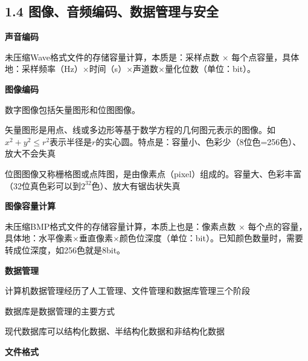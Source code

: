 \setcounter{section}{1}
\setcounter{subsection}{2}
\subsection{1.4 图像、音频编码、数据管理与安全}



\begin{compactenum}[1.]
\item \textbf{声音编码}

未压缩Wave格式文件的存储容量计算，本质是：采样点数 $\times$
每个点容量，具体地：采样频率（Hz）$\times$时间（s）$\times$声道数$\times$量化位数（单位：bit）。

\item \textbf{图像编码}

	\begin{compactitem}
	\item  数字图像包括矢量图形和位图图像。
	\item  矢量图形是用点、线或多边形等基于数学方程的几何图元表示的图像。如$x^2 + y^2 \le r^2$表示半径是$r$的实心圆。特点是：容量小、色彩少（8位色=256色）、放大不会失真
	\item  位图图像又称栅格图或点阵图，是由像素点（pixel）组成的。容量大、色彩丰富（32位真色彩可以到$2^{32}$色）、放大有锯齿状失真
	\end{compactitem}

\item \textbf{图像容量计算}

未压缩BMP格式文件的存储容量计算，本质上也是：像素点数 $\times$
每个点的容量，具体地：水平像素$\times$垂直像素$\times$颜色位深度（单位：bit）。已知颜色数量时，需要转成位深度，如256色就是8bit。

\item \textbf{数据管理}

	\begin{compactitem}
	\item  计算机数据管理经历了人工管理、文件管理和数据库管理三个阶段
	\item  数据库是数据管理的主要方式
	\item  现代数据库可以结构化数据、半结构化数据和非结构化数据
	\end{compactitem}

\item \textbf{文件格式}


\end{compactenum}

